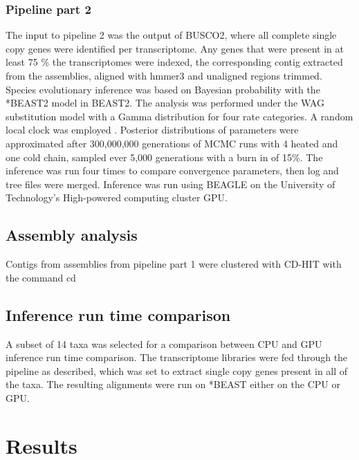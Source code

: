 \documentclass[12pt]{article}
\begin{document}
\subsubsection*{Pipeline part 2}
The input to pipeline 2 was the output of BUSCO2, where all complete single copy genes were identified per transcriptome. 
Any genes that were present in at least 75 \% the transcriptomes were indexed, the corresponding contig extracted from the assemblies, aligned with hmmer3 and unaligned regions trimmed. 
Species evolutionary inference was based on Bayesian probability with the *BEAST2 model in BEAST2. 
The analysis was performed under the WAG substitution model \cite{whelan2001general} with a Gamma distribution for four rate categories. 
A random local clock was employed \cite{drummond2010bayesian}. 
Posterior distributions of parameters were approximated after 300,000,000 generations of MCMC runs with 4 heated and one cold chain, sampled ever 5,000 generations  with a burn in of 15\%. 
The inference was run four times to compare convergence parameters, then log and tree files were merged. 
Inference was run using BEAGLE \cite{ayres2011beagle} on the University of Technology's High-powered computing cluster GPU.

\subsection*{Assembly analysis}
Contigs from assemblies from pipeline part 1 were clustered with CD-HIT with the command cd  
\subsection*{Inference run time comparison}
A subset of 14 taxa was selected for a comparison between CPU and GPU inference run time comparison. 
The transcriptome libraries were fed through the pipeline as described, which was set to extract single copy genes present in all of the taxa. 
The resulting alignments were run on *BEAST either on the CPU or GPU.

\newpage
\section{Results}
\end{document}
